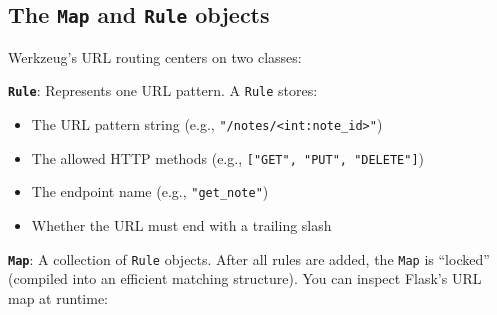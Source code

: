 \subsection*{\texorpdfstring{The \texttt{Map} and \texttt{Rule} objects}{The Map and Rule objects}}\label{04-request-handling-paths:the-map-and-rule-objects}

Werkzeug's URL routing centers on two classes:

\textbf{\texttt{Rule}}: Represents one URL pattern. A \texttt{Rule} stores:

\begin{itemize}
\tightlist
\item
  The URL pattern string (e.g., \texttt{"/}\allowbreak{}\texttt{notes/}\allowbreak{}\texttt{\textless{}int:note\_id\textgreater{}"})
\item
  The allowed HTTP methods (e.g., \texttt{{[}"GET",}\allowbreak{}\texttt{\ "PUT",}\allowbreak{}\texttt{\ "DELETE"{]}})
\item
  The endpoint name (e.g., \texttt{"get\_note"})
\item
  Whether the URL must end with a trailing slash
\end{itemize}

\noindent{}\textbf{\texttt{Map}}: A collection of \texttt{Rule} objects. After all rules are added, the \texttt{Map} is ``locked'' (compiled into an efficient matching structure). You can inspect Flask's URL map at runtime:

